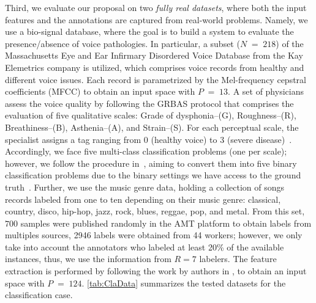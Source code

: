 \documentclass[journal]{IEEEtran}
\DeclareMathOperator{\igual}{\!\,=\!\,}
\begin{document}
Third, we evaluate our proposal on two \textit{fully real datasets}, where both the input features and the annotations are captured from real-world problems. Namely, we use a bio-signal database, where the goal is to build a system to evaluate the presence/absence of voice pathologies. In particular, a subset ($N\igual218$) of the Massachusetts Eye and Ear Infirmary Disordered Voice Database from the Kay Elemetrics company is utilized, which comprises voice records from healthy and different voice issues.  Each record is parametrized by the Mel-frequency cepstral coefficients (MFCC) to obtain an input space with $P\igual13$.  A set of physicians assess the voice quality by following the GRBAS protocol that comprises the evaluation of five qualitative scales: Grade of dysphonia--(G), Roughness--(R), Breathiness--(B), Asthenia--(A), and Strain--(S). For each perceptual scale, the specialist assigns a tag ranging from 0 (healthy voice) to 3 (severe disease)~\cite{arias2011automatic}. Accordingly, we face five multi-class classification problems (one per scale); however, we follow the procedure in~\cite{gil2018learning}, aiming to convert them into five binary classification problems due to the binary settings we have access to the ground truth~\cite{gonzalez2015automatic}. Further, we use the music genre data, holding a collection of songs records labeled from one to ten depending on their music genre: classical, country, disco, hip-hop, jazz, rock, blues, reggae, pop, and metal. From this set, $700$ samples were published randomly in the AMT platform to obtain labels from multiples sources, 2946 labels were obtained from 44 workers; however, we only take into account the annotators who labeled at least 20\% of the available instances, thus, we use the information from $R = 7$ labelers. The feature extraction is performed by following the work by authors in \cite{rodrigues2013learning}, to obtain an input space with $P\igual124$. \cref{tab:ClaData} summarizes the tested datasets for the classification case.\\
\end{document}
